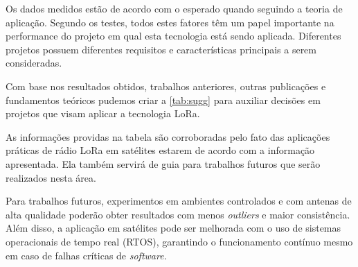 \documentclass[
	12pt,				%
	openright,			%
	twoside,			%
	a4paper,			%
	english,			%
	french,				%
	spanish,			%
	brazil				%
	]{abntex2}
\begin{document}
Os dados medidos estão de acordo com o esperado quando seguindo a teoria de aplicação. Segundo os testes, todos estes fatores têm um papel importante na performance do projeto em qual esta tecnologia está sendo aplicada. Diferentes projetos possuem diferentes requisitos e características principais a serem consideradas.

 Com base nos resultados obtidos, trabalhos anteriores, outras publicações e fundamentos teóricos pudemos criar a \autoref{tab:sugg} para auxiliar decisões em projetos que visam aplicar a tecnologia LoRa.

As informações providas na tabela são corroboradas pelo fato das aplicações práticas de rádio LoRa em satélites estarem de acordo com a informação apresentada. Ela também servirá de guia para trabalhos futuros que serão realizados nesta área.

Para trabalhos futuros, experimentos em ambientes controlados e com antenas de alta qualidade poderão obter resultados com menos \emph{outliers} e maior consistência. Além disso, a aplicação em satélites pode ser melhorada com o uso de sistemas operacionais de tempo real (RTOS), garantindo o funcionamento contínuo mesmo em caso de falhas críticas de \emph{software}.

\postextual



%
%



\printindex
\end{document}
